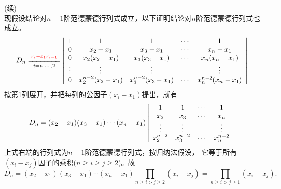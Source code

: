 \begin{frame}
  \begin{footnotesize}
    \proofname(续) \\[0.2cm]
    现假设结论对$n-1$阶范德蒙德行列式成立，以下证明结论对$n$阶范德蒙德行列式也成立。\pause 
    $$
    D_n \xlongequal[i=n,\cdots, 2]{\red{r_i - x_1 r_{i-1}}}\left|
    \begin{array}{ccccc}  
      1     & 1                    & 1                       & \cd   & 1    \\
      0     & x_2 - x_1            & x_3 - x_1               &  \cd  & x_n - x_1 \\
      0     & x_2(x_2 - x_1)       & x_3(x_3 - x_1)          &  \cd  & x_n(x_n - x_1)\\
      \vd   & \vd                  & \vd                     &      & \vd   \\
      0     & x_2^{n-2}(x_2-x_1)    & x_3^{n-2}(x_3 - x_1)    &  \cd  & x_n^{n-2}(x_n - x_1) 
    \end{array}\right|
    $$ \pause 
    按第1列展开，并把每列的公因子$(x_i-x_1)$提出，就有
    $$
    D_n = (x_2-x_1)(x_3-x_1)\cdots(x_n-x_1)\left|
    \begin{array}{cccc}  
      1            & 1          &  \cdots  & 1 \\
      x_2          & x_3         &  \cdots  & x_n\\
      \vdots          & \vdots         &      & \vdots   \\
      x_2^{n-2}     & x_3^{n-2}    &  \cdots  & x_n^{n-2}
    \end{array}\right|
    $$
    \pause 上式右端的行列式为$n-1$阶范德蒙德行列式，按归纳法假设，
    它等于所有$(x_i-x_j)$因子的乘积($n\ge i \ge j \ge 2$)。故
    $$
    D_n = (x_2-x_1)(x_3-x_1)\cdots(x_n-x_1) \prod_{n\ge i > j \ge 2}(x_i - x_j)
    = \prod_{n\ge i > j \ge 1}(x_i - x_j).
    $$
  \end{footnotesize}
\end{frame}

